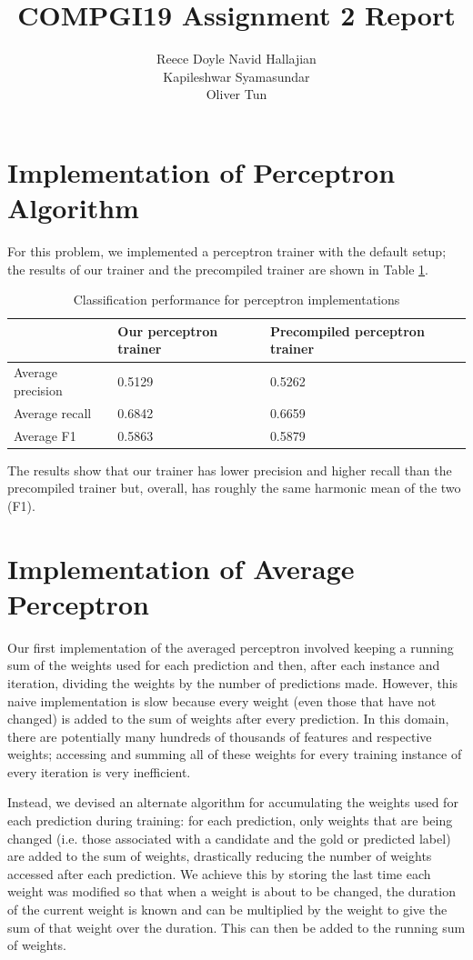 \documentclass{article} %
\title{COMPGI19 Assignment 2 Report}
\author{
Reece Doyle
\And
Navid Hallajian \\
\And
Kapileshwar Syamasundar \\
\And
Oliver Tun \\
}
\begin{document}
\maketitle

\section{Implementation of Perceptron Algorithm}
For this problem, we implemented a perceptron trainer with the default setup; the results of our trainer and the precompiled trainer are shown in Table \ref{table:1_perf}.

\begin{table}[htb]
\centering
\caption{Classification performance for perceptron implementations}
\label{table:1_perf}
\begin{tabular}{l|l|l|}
\cline{2-3}
                                        & Our perceptron trainer & Precompiled perceptron trainer \\ \hline
\multicolumn{1}{|l|}{Average precision} & 0.5129     & 0.5262             \\ \hline
\multicolumn{1}{|l|}{Average recall}    & 0.6842     & 0.6659              \\ \hline
\multicolumn{1}{|l|}{Average F1}        & 0.5863     & 0.5879             \\ \hline
\end{tabular}
\end{table}

The results show that our trainer has lower precision and higher recall than the precompiled trainer but, overall, has roughly the same harmonic mean of the two (F1).
\section{Implementation of Average Perceptron}

Our first implementation of the averaged perceptron involved keeping a running sum of the weights used for each prediction and then, after each instance and iteration, dividing the weights by the number of predictions made. However, this naive implementation is slow because every weight (even those that have not changed) is added to the sum of weights after every prediction. In this domain, there are potentially many hundreds of thousands of features and respective weights; accessing and summing all of these weights for every training instance of every iteration is very inefficient.

Instead, we devised an alternate algorithm for accumulating the weights used for each prediction during training: for each prediction, only weights that are being changed (i.e. those associated with a candidate and the gold or predicted label) are added to the sum of weights, drastically reducing the number of weights accessed after each prediction. We achieve this by storing the last time each weight was modified so that when a weight is about to be changed, the duration of the current weight is known and can be multiplied by the weight to give the sum of that weight over the duration. This can then be added to the running sum of weights.
\end{document}
